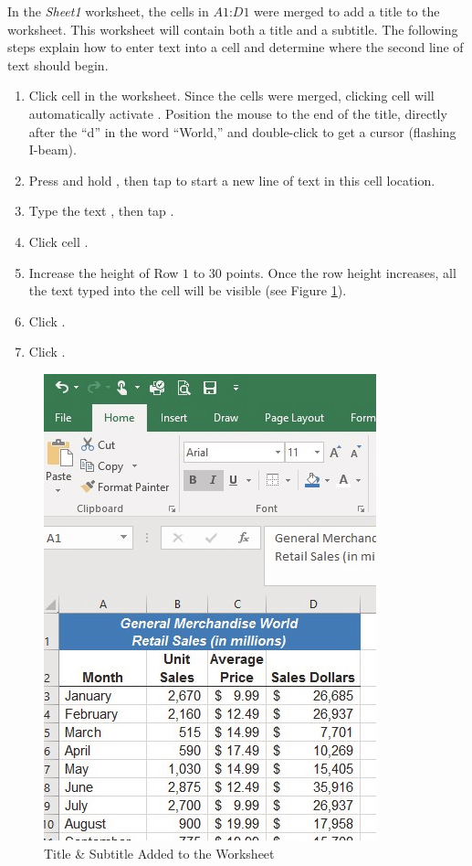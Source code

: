 In the \textit{Sheet1} worksheet, the cells in $ A1 $:$ D1 $ were merged to add a title to the worksheet. This worksheet will contain both a title and a subtitle. The following steps explain how to enter text into a cell and determine where the second line of text should begin.

\begin{enumbox}
	\begin{enumerate}
		\item Click cell  in the  worksheet. Since the cells were merged, clicking cell  will automatically activate . Position the mouse to the end of the title, directly after the ``d'' in the word ``World,'' and double-click to get a cursor (flashing I-beam).
		\item Press and hold , then tap  to start a new line of text in this cell location.
		\item Type the text , then tap .
		\item Click cell . 
		\item Increase the height of Row $ 1 $ to $ 30 $ points. Once the row height increases, all the text typed into the cell will be visible (see Figure \ref{01:fig41}).
		\item Click .
		\item Click .
	\end{enumerate}
\end{enumbox}

\begin{figure}[H]
	\centering
	\includegraphics[width=\maxwidth{.95\linewidth}]{gfx/ch01_fig41}
	\caption{Title \& Subtitle Added to the Worksheet}
	\label{01:fig41}
\end{figure}

